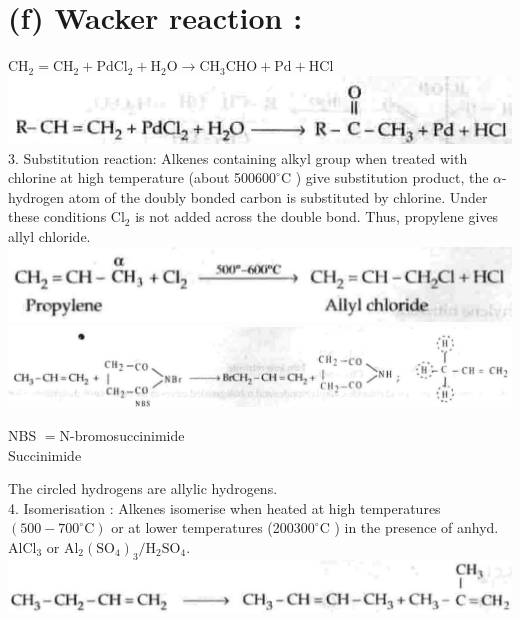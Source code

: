 \documentclass[10pt]{article}
\begin{document}
\section*{(f) Wacker reaction :}
$\mathrm{CH}_{2}=\mathrm{CH}_{2}+\mathrm{PdCl}_{2}+\mathrm{H}_{2} \mathrm{O} \longrightarrow \mathrm{CH}_{3} \mathrm{CHO}+\mathrm{Pd}+\mathrm{HCl}$\\
\includegraphics[max width=\textwidth, center]{2025_01_28_8470952b98110cec3aabg-184}\\
3. Substitution reaction: Alkenes containing alkyl group when treated with chlorine at high temperature (about 500$600^{\circ} \mathrm{C}$ ) give substitution product, the $\alpha$-hydrogen atom of the doubly bonded carbon is substituted by chlorine. Under these conditions $\mathrm{Cl}_{2}$ is not added across the double bond. Thus, propylene gives allyl chloride.\\
\includegraphics[max width=\textwidth, center]{2025_01_28_8470952b98110cec3aabg-185(2)}\\
\includegraphics[max width=\textwidth, center]{2025_01_28_8470952b98110cec3aabg-185(5)}

NBS $=\mathrm{N}$-bromosuccinimide\\
Succinimide

The circled hydrogens are allylic hydrogens.\\
4. Isomerisation : Alkenes isomerise when heated at high temperatures $\left(500-700^{\circ} \mathrm{C}\right)$ or at lower temperatures (200$300^{\circ} \mathrm{C}$ ) in the presence of anhyd. $\mathrm{AlCl}_{3}$ or $\mathrm{Al}_{2}\left(\mathrm{SO}_{4}\right)_{3} / \mathrm{H}_{2} \mathrm{SO}_{4}$.\\
\includegraphics[max width=\textwidth, center]{2025_01_28_8470952b98110cec3aabg-185}
\end{document}
